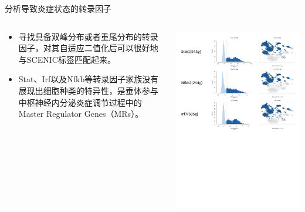 \documentclass{beamer}
\begin{document}
\begin{frame}{分析导致炎症状态的转录因子}
  \begin{columns}
    \begin{column}{.5\linewidth}
      \begin{itemize}
        \item 寻找具备双峰分布或者重尾分布的转录因子，对其自适应二值化后可以很好地与SCENIC标签匹配起来。
        \item Stat、Irf以及Nfkb等转录因子家族没有展现出细胞种类的特异性，是垂体参与中枢神经内分泌炎症调节过程中的Master Regulator Genes（MRs）。
      \end{itemize}
    \end{column}

    \begin{column}{.5\linewidth}
      \includegraphics[width=\linewidth]{figs/expr-res5.pdf}
    \end{column}
  \end{columns}
\end{frame}
\end{document}

